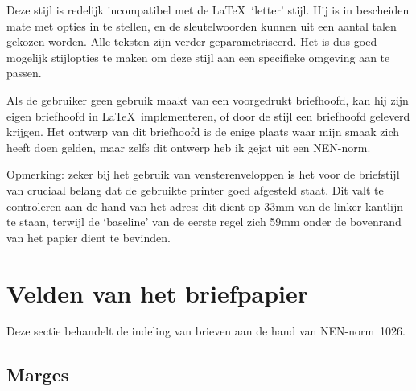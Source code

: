 Deze stijl is redelijk incompatibel met de \LaTeX\ `letter' stijl.              
Hij is in bescheiden mate met opties in te stellen,                             
en de sleutelwoorden kunnen uit een aantal talen                                
gekozen worden. Alle teksten zijn verder geparametriseerd.                      
Het is dus goed mogelijk stijlopties te maken om deze stijl                     
aan een specifieke omgeving aan te passen.                                      
                                                                                
Als de gebruiker geen gebruik maakt van een voorgedrukt briefhoofd,             
kan hij zijn eigen briefhoofd in \LaTeX\ implementeren, of                      
door de stijl een briefhoofd geleverd krijgen. Het ontwerp van                  
dit briefhoofd is de enige plaats waar mijn smaak zich heeft                    
doen gelden, maar zelfs dit ontwerp heb ik gejat uit een NEN-norm.              
                                                                                
Opmerking: zeker bij het gebruik van vensterenveloppen is het                   
voor de briefstijl                                                              
van cruciaal belang dat de gebruikte printer goed afgesteld                     
staat. Dit valt te controleren aan de hand van het adres:                       
dit dient op  33mm van de linker kantlijn te staan, terwijl                     
de `baseline' van de eerste regel zich 59mm onder de bovenrand                  
van het papier dient te bevinden.                                               
                                                                                
\section{Velden van het briefpapier}                                            
                                                                                
Deze sectie behandelt de indeling van brieven aan de hand                       
van NEN-norm~1026.                                                              
                                                                                
\subsection{Marges}                                                             
                                                                                
